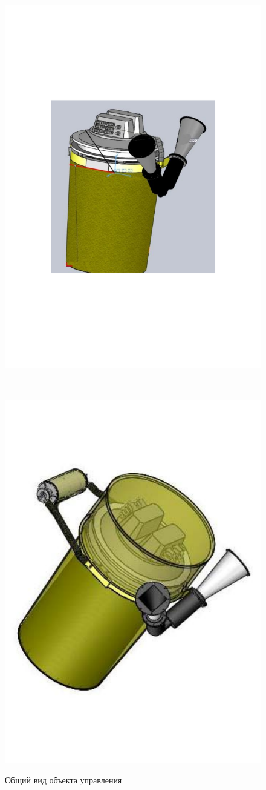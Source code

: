 \begin{figure}[ht!]
    \centering
    \begin{minipage}{0.5\textwidth}
        \centering
        \includegraphics[width=0.5\linewidth, keepaspectratio]
                        {./src/pictures/sattelite_3d_images/control_object_view_1}
        \label{control_object_view_1}
    \end{minipage}~
    \begin{minipage}{0.5\textwidth}
        \centering
        \includegraphics[width=0.5\linewidth, keepaspectratio]
                        {./src/pictures/sattelite_3d_images/control_object_view_2}
        \label{control_object_view_2}
    \end{minipage}

    \caption{Общий вид объекта управления}
    \label{control_object_general_view}
\end{figure}

